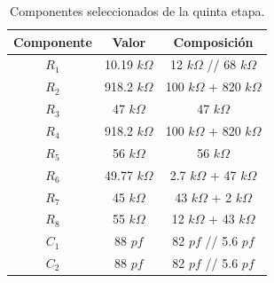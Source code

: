\begin{multicols}{2}
\begin{table}[H]
\centering
\begin{tabular}{ccc}
\hline
\multicolumn{1}{c}{Componente} & \multicolumn{1}{c}{Valor} & Composición \\ \hline
$R_1$                           & 10.19 $k\Omega$                     & 12 $k\Omega$ // 68 $k\Omega$    \\
$R_2$                           & 918.2 $k\Omega$                     & 100 $k\Omega$ + 820 $k\Omega$   \\
$R_3$                           & 47 $k\Omega$                        & 47 $k\Omega$         \\
$R_4$                           & 918.2 $k\Omega$                     & 100 $k\Omega$ + 820 $k\Omega$   \\
$R_5$                           & 56 $k\Omega$                        & 56 $k\Omega$         \\
$R_6$                           & 49.77 $k\Omega$                     & 2.7 $k\Omega$ + 47 $k\Omega$    \\
$R_7$                           & 45 $k\Omega$                        & 43 $k\Omega$ + 2 $k\Omega$         \\
$R_8$                           & 55 $k\Omega$                        & 12 $k\Omega$ + 43 $k\Omega$         \\
$C_1$                           & 88 $pf$                      & 82 $pf$ // 5.6 $pf$    \\
$C_2$                           & 88 $pf$                      & 82 $pf$ // 5.6 $pf$   \\
\hline
\end{tabular}
\caption{Componentes seleccionados de la quinta etapa.}
\end{table}


\end{multicols}
